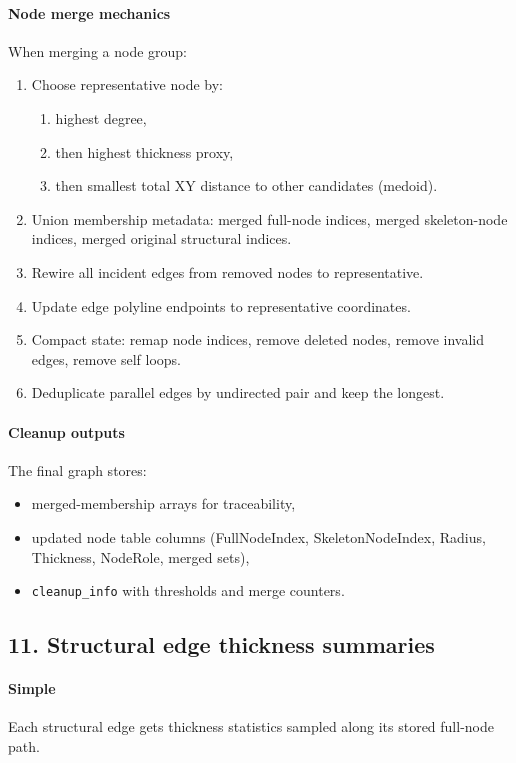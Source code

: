 \documentclass[11pt]{article}
\begin{document}
\paragraph{Node merge mechanics}
When merging a node group:
\begin{enumerate}
  \item Choose representative node by:
  \begin{enumerate}
    \item highest degree,
    \item then highest thickness proxy,
    \item then smallest total XY distance to other candidates (medoid).
  \end{enumerate}
  \item Union membership metadata:
  merged full-node indices, merged skeleton-node indices, merged original structural indices.
  \item Rewire all incident edges from removed nodes to representative.
  \item Update edge polyline endpoints to representative coordinates.
  \item Compact state:
  remap node indices, remove deleted nodes, remove invalid edges, remove self loops.
  \item Deduplicate parallel edges by undirected pair and keep the longest.
\end{enumerate}

\paragraph{Cleanup outputs}
The final graph stores:
\begin{itemize}
  \item merged-membership arrays for traceability,
  \item updated node table columns (FullNodeIndex, SkeletonNodeIndex, Radius, Thickness, NodeRole, merged sets),
  \item \texttt{cleanup\_info} with thresholds and merge counters.
\end{itemize}

\subsection*{11. Structural edge thickness summaries}
\paragraph{Simple}
Each structural edge gets thickness statistics sampled along its stored full-node path.
\end{document}
